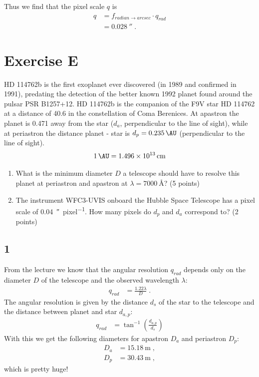 \documentclass[11pt,a4paper,twoside]{article}
\begin{document}
Thus we find that the pixel scale $q$ is
\begin{align}
    q &= f_{radian \rightarrow arcsec} \cdot q_{rad} \\
    &= \SI{0.028}{\arcsecond} \;.
\end{align}


\section*{Exercise E}
HD 114762b is the first exoplanet ever discovered (in 1989 and confirmed in
1991), predating the detection of the better known 1992 planet found around the 
pulsar PSR B1257+12. HD 114762b is the companion of the F9V star HD 114762 at 
a distance of \SI{40.6}{\parsec} in the constellation of Coma Berenices.
At apastron the planet is \SI{0.471}{\AU} away from the star ($d_a$, 
perpendicular to the line of sight), while at periastron the distance 
planet - star is $d_p = \SI{0.235}{\AU}$ (perpendicular to the  line of sight).
$$\SI{1}{\AU} = \SI{1.496d13}{\centi\meter}$$

\begin{enumerate}
\item What is the minimum diameter $D$ a telescope should have to resolve this 
planet at periastron and apastron at $\lambda = \SI{7000}{\angstrom}$? 
(5 points)
\item The instrument WFC3-UVIS onboard the Hubble Space Telescope has a pixel 
scale of \SI{0.04}{\arcsecond\per pixel}. How many pixels do $d_p$ and $d_a$ 
correspond to? (2 points)
\end{enumerate}


\subsection*{1}
From the lecture we know that the angular resolution $q_{rad}$ depends only on 
the diameter $D$ of the telescope and the observed wavelength $\lambda$:
\begin{align}
    q_{rad} &= \frac{1.22 \lambda}{D} \;.
\end{align}
The angular resolution is given by the distance $d_s$ of the star to the 
telescope and the distance between planet and star $d_{a,p}$:
\begin{align}
    q_{rad} &= \tan^{-1}\left( \frac{d_{a,p}}{d_s} \right)
\end{align}
With this we get the following diameters for apastron $D_a$ and periastron 
$D_p$:
\begin{align}
    D_a &= \SI{15.18}{\meter}  \;, \\
    D_p &= \SI{30.43}{\meter}  \;,
\end{align}
which is pretty huge!
\end{document}
